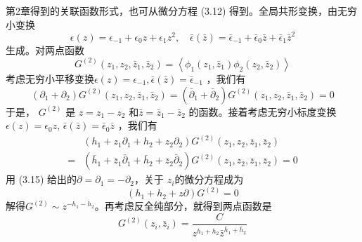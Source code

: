 第2章得到的关联函数形式，也可从微分方程 (3.12) 得到。全局共形变换，由无穷小变换
\begin{equation}
\epsilon(z)=\epsilon_{-1}+\epsilon_{0} z+\epsilon_{1} z^{2}, \quad \bar{\epsilon}(\bar{z})=\bar{\epsilon}_{-1}+\bar{\epsilon}_{0} \bar{z}+\bar{\epsilon}_{1} \bar{z}^{2}
\end{equation}
生成。对两点函数
\begin{equation}
G^{(2)}\left(z_{1}, z_{2}, \bar{z}_{1}, \bar{z}_{2}\right)=\left\langle\phi_{1}\left(z_{1}, \bar{z}_{1}\right) \phi_{2}\left(z_{2}, \bar{z}_{2}\right)\right\rangle
\end{equation}
考虑无穷小平移变换$ \epsilon(z)=\epsilon_{-1}, \bar{\epsilon}(\bar{z})=\bar{\epsilon}_{-1}$ ，我们有
\begin{equation}
\left(\partial_{1}+\partial_{2}\right) G^{(2)}\left(z_{1}, z_{2}, \bar{z}_{1}, \bar{z}_{2}\right)=\left(\bar{\partial}_{1}+\bar{\partial}_{2}\right) G^{(2)}\left(z_{1}, z_{2}, \bar{z}_{1}, \bar{z}_{2}\right)=0
\end{equation}
于是， $G^{(2)}$ 是 $z=z_1-z_2$ 和$ \bar{z}=\bar{z}_1-\bar{z}_2$ 的函数。接着考虑无穷小标度变换$ \epsilon(z)=\epsilon_{0} z$, $\bar{\epsilon}(\bar{z})=\bar{\epsilon}_{0} \bar{z}$ ，我们有
\begin{equation}
\begin{aligned} &\left(h_{1}+z_{1} \partial_{1}+h_{2}+z_{2} \partial_{2}\right) G^{(2)}\left(z_{1}, z_{2}, \bar{z}_{1}, \bar{z}_{2}\right) \\ =&\left(\bar{h}_{1}+\bar{z}_{1} \bar{\partial}_{1}+\bar{h}_{2}+\bar{z}_{2} \bar{\partial}_{2}\right) G^{(2)}\left(z_{1}, z_{2}, \bar{z}_{1}, \bar{z}_{2}\right)=0 \end{aligned}
\end{equation}
用 (3.15) 给出的$ \partial=\partial_{1}=-\partial_{2} $，关于 $z_i $的微分方程成为
\[
\left(h_{1}+h_{2}+z \partial\right) G^{(2)}=0
\]
解得$ G^{(2)} \sim z^{-h_{1}-h_{2}}$。再考虑反全纯部分，就得到两点函数是
\begin{equation}
G^{(2)}\left(z_{i}, \bar{z}_{i}\right)=\frac{C}{z^{h_{1}+h_{2}} \bar{z}^{\bar{h}_{1}+\bar{h}_{2}}}
\end{equation}

